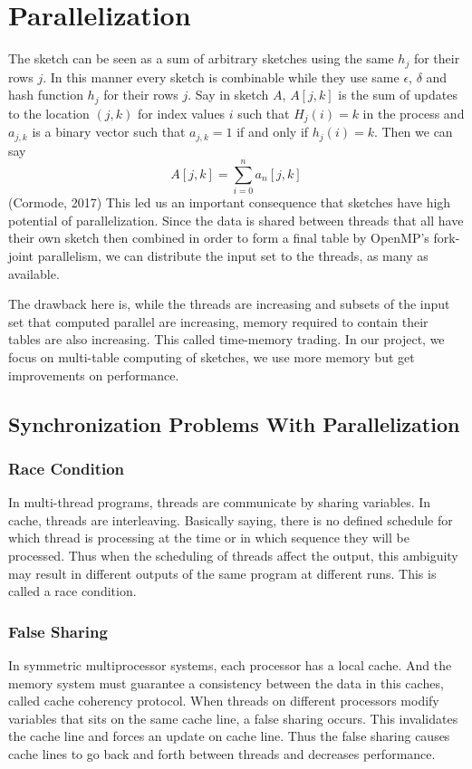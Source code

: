 \documentclass[twoside]{article}
\begin{document}
\section{Parallelization}
The sketch can be seen as a sum of arbitrary sketches using the same $h_{j}$ for their rows $j$. In this manner every sketch is combinable while they use same $\epsilon$, $\delta$ and hash function $h_{j}$ for their rows $j$.
Say in sketch $A$, $A[j,k]$ is the sum of updates to the location $(j,k)$ for index values $i$ such that $H_{j}(i) = k$ in the process and $a_{j,k}$ is a binary vector such that $a_{j,k} = 1$ if and only if $h_j(i) = k$.
Then we can say $$A[j,k] = \sum_{{i=0}}^{{n}}a_{n}[j,k]$$
(Cormode, 2017)
This led us an important consequence that sketches have high potential of parallelization. Since the data is shared between threads that all have their own sketch then combined in order to form a final table by OpenMP's fork-joint parallelism, we can distribute the input set to the threads, as many as available.
\par The drawback here is, while the threads are increasing and subsets of the input set that computed parallel are increasing, memory required to contain their tables are also increasing. This called time-memory trading. In our project, we focus on multi-table computing of sketches, we use more memory but get improvements on performance.

\subsection{Synchronization Problems With Parallelization}
\subsubsection{Race Condition}
In multi-thread programs, threads are communicate by sharing variables. In cache, threads are interleaving. Basically saying, there is no defined schedule for which thread is processing at the time or in which sequence they will be processed. Thus when the scheduling of threads affect the output, this ambiguity may result in different outputs of the same program at different runs. This is called a race condition.
\subsubsection{False Sharing}
In symmetric multiprocessor systems, each processor has a local cache. And the memory system must guarantee a consistency between the data in this caches, called cache coherency protocol. When threads on different processors modify variables that sits on the same cache line, a false sharing occurs. This invalidates the cache line and forces an update on cache line. Thus the false sharing causes cache lines to go back and forth between threads and decreases performance.
\end{document}
